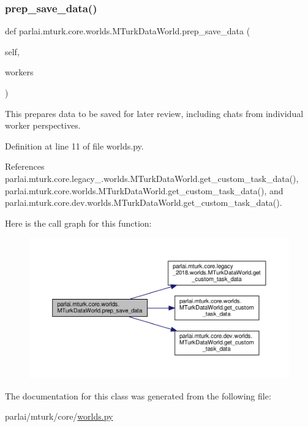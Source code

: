 \subsubsection{\texorpdfstring{prep\+\_\+save\+\_\+data()}{prep\_save\_data()}}
{\footnotesize\ttfamily def parlai.\+mturk.\+core.\+worlds.\+M\+Turk\+Data\+World.\+prep\+\_\+save\+\_\+data (\begin{DoxyParamCaption}\item[{}]{self,  }\item[{}]{workers }\end{DoxyParamCaption})}

\begin{DoxyVerb}This prepares data to be saved for later review, including
chats from individual worker perspectives.\end{DoxyVerb}
 

Definition at line 11 of file worlds.\+py.



References parlai.\+mturk.\+core.\+legacy\+\_.\+worlds.\+M\+Turk\+Data\+World.\+get\+\_\+custom\+\_\+task\+\_\+data(), parlai.\+mturk.\+core.\+worlds.\+M\+Turk\+Data\+World.\+get\+\_\+custom\+\_\+task\+\_\+data(), and parlai.\+mturk.\+core.\+dev.\+worlds.\+M\+Turk\+Data\+World.\+get\+\_\+custom\+\_\+task\+\_\+data().

Here is the call graph for this function\+:
\nopagebreak
\begin{figure}[H]
\begin{center}
\leavevmode
\includegraphics[width=350pt]{classparlai_1_1mturk_1_1core_1_1worlds_1_1MTurkDataWorld_a13f5b85f9694627df2e181267588d4dc_cgraph}
\end{center}
\end{figure}


The documentation for this class was generated from the following file\+:\begin{DoxyCompactItemize}
\item 
parlai/mturk/core/\hyperlink{parlai_2mturk_2core_2worlds_8py}{worlds.\+py}\end{DoxyCompactItemize}
